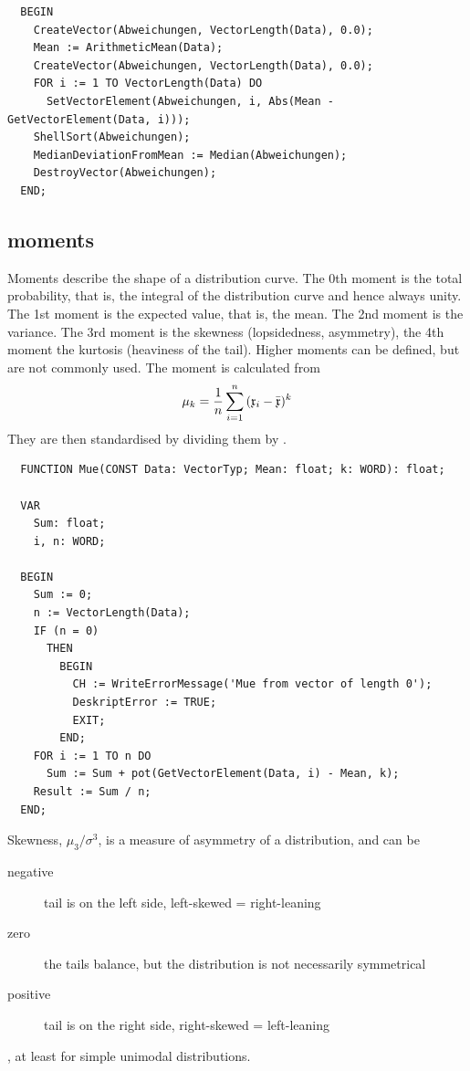 \begin{refsection}
\begin{lstlisting}
  BEGIN
    CreateVector(Abweichungen, VectorLength(Data), 0.0);
    Mean := ArithmeticMean(Data);
    CreateVector(Abweichungen, VectorLength(Data), 0.0);
    FOR i := 1 TO VectorLength(Data) DO
      SetVectorElement(Abweichungen, i, Abs(Mean - GetVectorElement(Data, i)));
    ShellSort(Abweichungen);
    MedianDeviationFromMean := Median(Abweichungen);
    DestroyVector(Abweichungen);
  END;
\end{lstlisting}

\subsection{ moments}

Moments describe the shape of a distribution curve. The 0th moment is the total probability, that is, the integral of the distribution curve and hence always unity. The 1st moment is the expected value, that is, the mean. The 2nd moment is the variance. The 3rd moment is the skewness (lopsidedness, asymmetry), the 4th moment the kurtosis (heaviness of the tail). Higher moments can be defined, but are not commonly used. The moment is calculated from
\begin{equation}
  \mu_k = \frac{1}{n} \sum_{i=1}^n{(\mathfrak{x}_i-\bar{\mathfrak{x}})^k}
\end{equation}
They are then standardised by dividing them by .

\begin{lstlisting}
  FUNCTION Mue(CONST Data: VectorTyp; Mean: float; k: WORD): float;

  VAR
    Sum: float;
    i, n: WORD;

  BEGIN
    Sum := 0;
    n := VectorLength(Data);
    IF (n = 0)
      THEN
        BEGIN
          CH := WriteErrorMessage('Mue from vector of length 0');
          DeskriptError := TRUE;
          EXIT;
        END;
    FOR i := 1 TO n DO
      Sum := Sum + pot(GetVectorElement(Data, i) - Mean, k);
    Result := Sum / n;
  END;
\end{lstlisting}

Skewness, \( \mu_3/\sigma^3\), is a measure of asymmetry of a distribution, and can be
\begin{description}
  \item[negative]{tail is on the left side, left-skewed = right-leaning}
  \item[zero]{the tails balance, but the distribution is not necessarily symmetrical}
  \item[positive]{tail is on the right side, right-skewed = left-leaning}
\end{description}
, at least for simple unimodal distributions.


\end{refsection}
